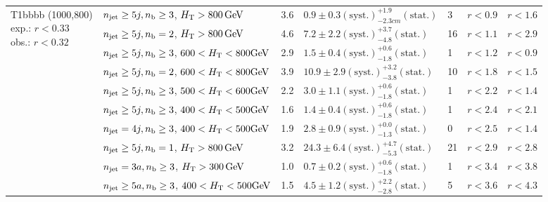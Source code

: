 \begin{table}[h!]
\begin{tabular}{ lllllll }
\multirow{10}{*}{\parbox[t]{2.3cm}{T1bbbb (1000,800)\\exp.: $r<0.33$\\obs.: $r<0.32$}}
 & $n_{\mathrm{jet}} \geq5j,n_{\text{b}} \geq3$, $\mbox{$H_\text{T}$} > 800 \, \mathrm{GeV}$ & 3.6 & $0.9 \pm 0.3 \mathrm{(syst.)} ^{+1.9}_{-2.3cm} \mathrm{(stat.)}$ & 3 & $r < 0.9$ & $r < 1.6$\\ 
 & $n_{\mathrm{jet}} \geq5j,n_{\text{b}} =2$, $\mbox{$H_\text{T}$} > 800 \, \mathrm{GeV}$ & 4.6 & $7.2 \pm 2.2 \mathrm{(syst.)} ^{+3.7}_{-4.8} \mathrm{(stat.)}$ & 16 & $r < 1.1$ & $r < 2.9$\\ 
 & $n_{\mathrm{jet}} \geq5j,n_{\text{b}} \geq3$, $600 < \mbox{$H_\text{T}$} < 800 \mathrm{GeV}$ & 2.9 & $1.5 \pm 0.4 \mathrm{(syst.)} ^{+0.6}_{-1.8} \mathrm{(stat.)}$ & 1 & $r < 1.2$ & $r < 0.9$\\ 
 & $n_{\mathrm{jet}} \geq5j,n_{\text{b}} =2$, $600 < \mbox{$H_\text{T}$} < 800 \mathrm{GeV}$ & 3.9 & $10.9 \pm 2.9 \mathrm{(syst.)} ^{+3.2}_{-3.8} \mathrm{(stat.)}$ & 10 & $r < 1.8$ & $r < 1.5$\\ 
 & $n_{\mathrm{jet}} \geq5j,n_{\text{b}} \geq3$, $500 < \mbox{$H_\text{T}$} < 600 \mathrm{GeV}$ & 2.2 & $3.0 \pm 1.1 \mathrm{(syst.)} ^{+0.6}_{-1.8} \mathrm{(stat.)}$ & 1 & $r < 2.2$ & $r < 1.4$\\ 
 & $n_{\mathrm{jet}} \geq5j,n_{\text{b}} \geq3$, $400 < \mbox{$H_\text{T}$} < 500 \mathrm{GeV}$ & 1.6 & $1.4 \pm 0.4 \mathrm{(syst.)} ^{+0.6}_{-1.8} \mathrm{(stat.)}$ & 1 & $r < 2.4$ & $r < 2.1$\\ 
 & $n_{\mathrm{jet}} =4j,n_{\text{b}} \geq3$, $400 < \mbox{$H_\text{T}$} < 500 \mathrm{GeV}$ & 1.9 & $2.8 \pm 0.9 \mathrm{(syst.)} ^{+0.0}_{-1.3} \mathrm{(stat.)}$ & 0 & $r < 2.5$ & $r < 1.4$\\ 
 & $n_{\mathrm{jet}} \geq5j,n_{\text{b}} =1$, $\mbox{$H_\text{T}$} > 800 \, \mathrm{GeV}$ & 3.2 & $24.3 \pm 6.4 \mathrm{(syst.)} ^{+4.7}_{-5.3} \mathrm{(stat.)}$ & 21 & $r < 2.9$ & $r < 2.8$\\ 
 & $n_{\mathrm{jet}} =3a,n_{\text{b}} \geq3$, $\mbox{$H_\text{T}$} > 300 \, \mathrm{GeV}$ & 1.0 & $0.7 \pm 0.2 \mathrm{(syst.)} ^{+0.6}_{-1.8} \mathrm{(stat.)}$ & 1 & $r < 3.4$ & $r < 3.8$\\ 
 & $n_{\mathrm{jet}} \geq5a,n_{\text{b}} \geq3$, $400 < \mbox{$H_\text{T}$} < 500 \mathrm{GeV}$ & 1.5 & $4.5 \pm 1.2 \mathrm{(syst.)} ^{+2.2}_{-2.8} \mathrm{(stat.)}$ & 5 & $r < 3.6$ & $r < 4.3$\\ \hline
    \hline
  \end{tabular}
\end{table}

